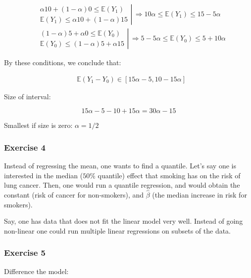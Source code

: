 {{$$
\begin{aligned}
& \left.\begin{array}{l}
\alpha 10+(1-\alpha) 0 \leq \mathbb{E}\left(Y_{1}\right) \\
\mathbb{E}\left(Y_{1}\right) \leq \alpha 10+(1-\alpha) 15
\end{array} \right\rvert\, \Rightarrow 10 \alpha \leq \mathbb{E}\left(Y_{1}\right) \leq 15-5{\alpha} \\
& \left.\begin{array}{l}
(1-\alpha) 5+\alpha 0 \leq \mathbb{E}\left(Y_{0}\right) \\
\mathbb{E}\left(Y_{0}\right) \leq(1-\alpha) 5+\alpha 15
\end{array} \right\rvert\, \Rightarrow 5-5 \alpha \leq \mathbb{E}\left(Y_{0}\right) \leq 5+10 \alpha
\end{aligned}
$$

By these conditions, we conclude that:

$$
\begin{aligned}
& \mathbb{E}\left(Y_{1}-Y_{0}\right) \in[15 \alpha-5,10-15 \alpha]
\end{aligned}
$$

Size of interval:

$$
15 \alpha-5-10+15 \alpha=30 \alpha-15
$$

Smallest if size is zero: $\alpha=1 / 2$
}
{
\subsubsection*{Exercise 4}

\begin{enumerate}[label=(\alph*)]
{\item 
Instead of regressing the mean, one wants to find a quantile. Let's say one is interested in the median ($50 \%$ quantile) effect that smoking has on the risk of lung cancer. Then, one would run a quantile regression, and would obtain the constant (risk of cancer for non-smokers), and $\hat{\beta}$ (the median increase in risk for smokers).
}
{\item 
Say, one has data that does not fit the linear model very well. Instead of going non-linear one could run multiple linear regressions on subsets of the data.
}
\end{enumerate}
}
{
\subsubsection*{Exercise 5}
Difference the model:

}}
